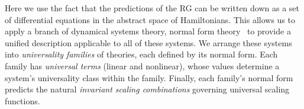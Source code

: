 \documentclass[
 reprint,
 amsmath,amssymb,
 aps, superscriptaddress, pre
]{revtex4-1}
\begin{document}
Here we use the fact that the predictions of the RG can be written down as a set of differential equations in the abstract space of Hamiltonians. This allows us to apply a branch of dynamical systems theory, normal form theory~\cite{murdock2006normal, PNFT1} to provide a unified description applicable to all of these systems. We arrange these systems into {\em universality
families} of theories, each defined by its normal form. Each family has 
{\em universal terms} (linear and nonlinear), whose values 
determine a system's universality
class within the family. Finally, each family's normal form predicts the
natural {\em invariant scaling
combinations} governing universal scaling functions.

\end{document}
